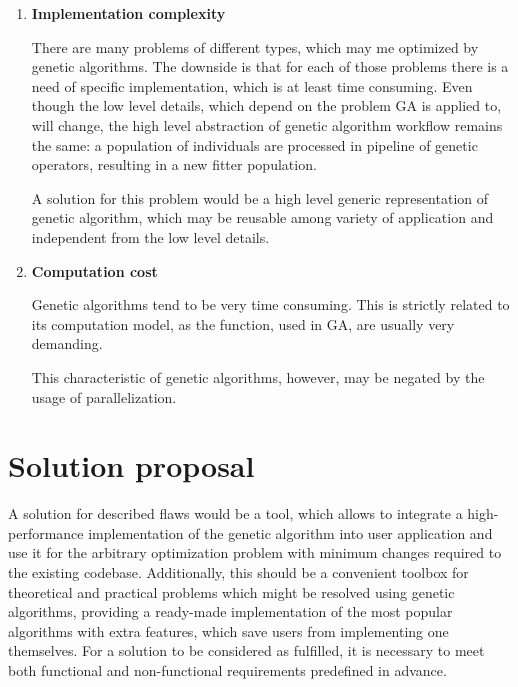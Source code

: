 \begin{enumerate}
\item \textbf{Implementation complexity}

There are many problems of different types, which may me optimized by genetic algorithms. The downside is that for each of those problems there is a need of specific implementation, which is at least time consuming. Even though the low level details, which depend on the problem GA is applied to, will change, the high level abstraction of genetic algorithm workflow remains the same: a population of individuals are processed in pipeline of genetic operators, resulting in a new fitter population.

A solution for this problem would be a high level generic representation of genetic algorithm, which may be reusable among variety of application and independent from the low level details. 
\medbreak

\item \textbf{Computation cost}

Genetic algorithms tend to be very time consuming. This is strictly related to its computation model, as the function, used in GA, are usually very demanding.

This characteristic of genetic algorithms, however, may be negated by the usage of parallelization.
\medbreak

\end{enumerate}

\section{Solution proposal}

A solution for described flaws would be a tool, which allows to integrate a high-performance implementation of the genetic algorithm into user application and use it for the arbitrary optimization problem with minimum changes required to the existing codebase. Additionally, this should be a convenient toolbox for theoretical and practical problems which might be resolved using genetic algorithms, providing a ready-made implementation of the most popular algorithms with extra features, which save users from implementing one themselves. For a solution to be considered as fulfilled, it is necessary to meet both functional and non-functional requirements predefined in advance.

